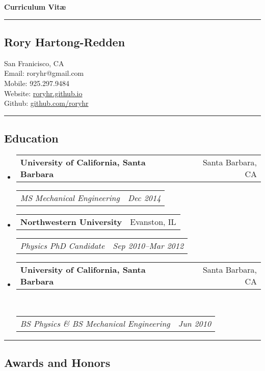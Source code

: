 \documentclass[10pt,letterpaper]{article}
\makeatletter
\newenvironment{indentsection}[1]%
{\begin{list}{}%
	{\setlength{\leftmargin}{#1}}%
	\item[]%
}
{\end{list}}
\newcommand{\headerrow}[2]
{\begin{tabular*}{\linewidth}{l@{\extracolsep{\fill}}r}
	#1 &
	#2 \\
\end{tabular*}}
\makeatother
\begin{document}
{\raggedright \LARGE \bf Curriculum Vit\ae}
\newline
\hrule
\subsection*{Rory Hartong-Redden}
\begin{indentsection}{\parindent}
San Franicisco, CA   \\
Email: roryhr@gmail.com \\
Mobile: 925.297.9484 \\
Website: \href{roryhr.github.io}{roryhr.github.io} \\
Github: \href{https://github.com/roryhr}{github.com/roryhr}
\end{indentsection}

\hrule
\subsection*{Education}
\begin{itemize}
	\parskip=-0.1em
	\item 
	\headerrow
		{\textbf{University of California, Santa Barbara}}
		{Santa Barbara, CA}
	\headerrow
		{\emph{MS  Mechanical Engineering}}
		{\emph{Dec 2014}}
	\item 
	\headerrow
		{\textbf{Northwestern University}}
		{Evanston, IL}
	\headerrow
		{\emph{Physics PhD Candidate}}
		{\emph{Sep 2010--Mar 2012}}
	\item 
	\headerrow
		{\textbf{University of California, Santa Barbara}}
		{Santa Barbara, CA}	\\
	\headerrow
		{\emph{BS Physics \&  BS Mechanical Engineering}}
		{\emph{Jun 2010}}
\end{itemize}

\hrule
\subsection*{Awards and Honors}
\end{document}

